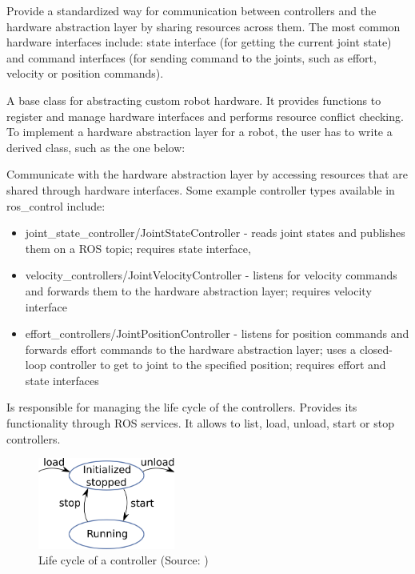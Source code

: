 \documentclass[english,inz,shortabstract]{iithesis}
\begin{document}
	\begin{description}[style=nextline]
		\item [Hardware interfaces]
		Provide a standardized way for communication between controllers and the hardware abstraction layer by sharing resources across them. The most common hardware interfaces include: state interface (for getting the current joint state) and command interfaces (for sending command to the joints, such as effort, velocity or position commands).   
		\item [RobotHW]
		A base class for abstracting custom robot hardware. It provides functions to register and manage hardware interfaces and performs resource conflict checking. To implement a hardware abstraction layer for a robot, the user has to write a derived class, such as the one below:
		
		\item [Controllers]
		Communicate with the hardware abstraction layer by accessing resources that are shared through hardware interfaces. Some example controller types available in \textsf{ros\_control} include:
			\begin{itemize}
				\item \textsf{joint\_state\_controller/JointStateController} - reads joint states and publishes them on a ROS topic; requires state interface,
				\item \textsf{velocity\_controllers/JointVelocityController} - listens for velocity commands and forwards them to the hardware abstraction layer; requires velocity interface
				\item \textsf{effort\_controllers/JointPositionController} - listens for position commands and forwards effort commands to the hardware abstraction layer; uses a closed-loop controller to get to joint to the specified position; requires effort and state interfaces
			\end{itemize}
		\item [Controller Manager]
		Is responsible for managing the life cycle of the controllers. Provides its functionality through ROS services. It allows to list, load, unload, start or stop controllers. 
		\begin{figure}[ht]
			\centering
			\includegraphics[height=3cm]{img/controller_life.png}
			\caption{Life cycle of a controller (Source: \cite{ros_control:cm_wiki})}
			\label{fig:controller_life}
		\end{figure}

	\end{description}
\end{document}
